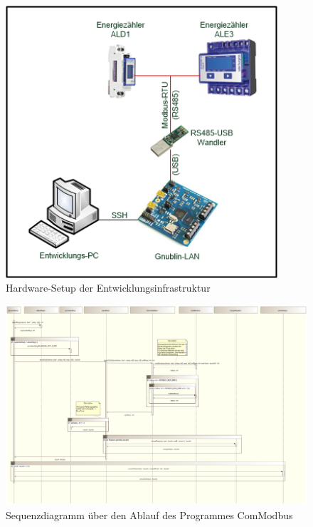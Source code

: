 \documentclass[Bachelorarbeit.tex]{subfiles}
\begin{document}
\begin{figure}
\includegraphics[width=0.9\textwidth]{./img/Labor-Aufbau.png}
\caption{Hardware-Setup der Entwicklungsinfrastruktur}
\label{pic:labor_aufbau}
\end{figure}

\begin{figure}
\centering
\includegraphics[angle=90,width=1\linewidth]{./img/Sequenzdiagramm_ComModbus}
\caption{Sequenzdiagramm über den Ablauf des Programmes ComModbus}
\label{pic:sequenzdiagramm_comModbus}
\end{figure}
\end{document}
